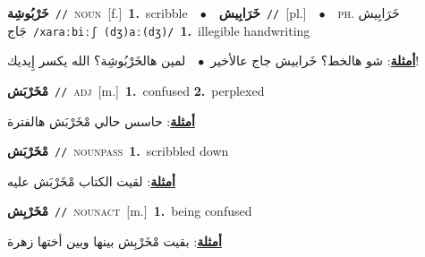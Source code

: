 \documentclass[10pt,a4paper,twoside]{article} %
\begin{document}
\begin{multicols}{2}
{{{{{{{{{{{{\setlength\topsep{0pt}\textbf{\foreignlanguage{arabic}{خَرْبُوشِة}}\ {\color{gray}\texttt{//}\color{black}}\ \textsc{noun}\ [f.]\ \textbf{1.}~scribble\ \ $\bullet$\ \ \setlength\topsep{0pt}\textbf{\foreignlanguage{arabic}{خَرَابِيش}}\ {\color{gray}\texttt{//}\color{black}}\ [pl.]\ \ $\bullet$\ \ \textsc{ph.} \color{gray} \foreignlanguage{arabic}{خَرَابِيش جَاج}\color{black}\ {\color{gray}\texttt{/{\sffamily xaraːbiːʃ (dʒ)aː(dʒ)}/}\color{black}}\ \textbf{1.}~illegible handwriting\  \begin{flushright}\color{gray}\foreignlanguage{arabic}{\textbf{\underline{\foreignlanguage{arabic}{أمثلة}}}: شو هالخط؟ خَرابيش جاج عالأخير\ $\bullet$\ \  لمين هالخَرْبُوشِة؟ الله يكسر إِيديك!}\end{flushright}\color{black}} \vspace{2mm}

{\setlength\topsep{0pt}\textbf{\foreignlanguage{arabic}{مْخَرْبَش}}\ {\color{gray}\texttt{//}\color{black}}\ \textsc{adj}\ [m.]\ \textbf{1.}~confused  \textbf{2.}~perplexed\  \begin{flushright}\color{gray}\foreignlanguage{arabic}{\textbf{\underline{\foreignlanguage{arabic}{أمثلة}}}: حاسس حالي مْخَرْبَش هالفترة}\end{flushright}\color{black}} \vspace{2mm}

{\setlength\topsep{0pt}\textbf{\foreignlanguage{arabic}{مْخَرْبَش}}\ {\color{gray}\texttt{//}\color{black}}\ \textsc{noun\textunderscore pass}\ \textbf{1.}~scribbled down\  \begin{flushright}\color{gray}\foreignlanguage{arabic}{\textbf{\underline{\foreignlanguage{arabic}{أمثلة}}}: لقيت الكتاب مْخَرْبَش عليه}\end{flushright}\color{black}} \vspace{2mm}

{\setlength\topsep{0pt}\textbf{\foreignlanguage{arabic}{مْخَرْبِش}}\ {\color{gray}\texttt{//}\color{black}}\ \textsc{noun\textunderscore act}\ [m.]\ \textbf{1.}~being confused\  \begin{flushright}\color{gray}\foreignlanguage{arabic}{\textbf{\underline{\foreignlanguage{arabic}{أمثلة}}}: بقيت مْخَرْبِش بينها وبين أختها زهرة}\end{flushright}\color{black}} \vspace{2mm}

}}}}}}}}}}}
\end{multicols}
\end{document}
